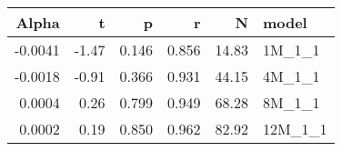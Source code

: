 \begin{table}[ht]
\centering
\begin{tabular}{rrrrrl}
  \hline
Alpha & t & p & r & N & model \\ 
  \hline
-0.0041 & -1.47 & 0.146 & 0.856 & 14.83 & 1M\_1\_1 \\ 
  -0.0018 & -0.91 & 0.366 & 0.931 & 44.15 & 4M\_1\_1 \\ 
  0.0004 & 0.26 & 0.799 & 0.949 & 68.28 & 8M\_1\_1 \\ 
  0.0002 & 0.19 & 0.850 & 0.962 & 82.92 & 12M\_1\_1 \\ 
   \hline
\end{tabular}
\end{table}


